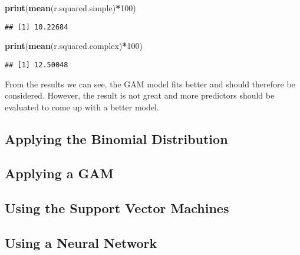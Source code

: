 \documentclass[
]{article}
\newenvironment{Shaded}{\begin{snugshade}}{\end{snugshade}}
\newcommand{\DecValTok}[1]{\textcolor[rgb]{0.00,0.00,0.81}{#1}}
\newcommand{\KeywordTok}[1]{\textcolor[rgb]{0.13,0.29,0.53}{\textbf{#1}}}
\newcommand{\NormalTok}[1]{#1}
\newcommand{\OperatorTok}[1]{\textcolor[rgb]{0.81,0.36,0.00}{\textbf{#1}}}
\begin{document}
\begin{Shaded}
\begin{Highlighting}[]
\KeywordTok{print}\NormalTok{(}\KeywordTok{mean}\NormalTok{(r.squared.simple)}\OperatorTok{*}\DecValTok{100}\NormalTok{)}
\end{Highlighting}
\end{Shaded}

\begin{verbatim}
## [1] 10.22684
\end{verbatim}

\begin{Shaded}
\begin{Highlighting}[]
\KeywordTok{print}\NormalTok{(}\KeywordTok{mean}\NormalTok{(r.squared.complex)}\OperatorTok{*}\DecValTok{100}\NormalTok{)}
\end{Highlighting}
\end{Shaded}

\begin{verbatim}
## [1] 12.50048
\end{verbatim}

From the results we can see, the GAM model fits better and should
therefore be considered. However, the result is not great and more
predictors should be evaluated to come up with a better model.

\hypertarget{applying-the-binomial-distribution}{%
\subsection{Applying the Binomial
Distribution}\label{applying-the-binomial-distribution}}

\hypertarget{applying-a-gam}{%
\subsection{Applying a GAM}\label{applying-a-gam}}

\hypertarget{using-the-support-vector-machines}{%
\subsection{Using the Support Vector
Machines}\label{using-the-support-vector-machines}}

\hypertarget{using-a-neural-network}{%
\subsection{Using a Neural Network}\label{using-a-neural-network}}
\end{document}
